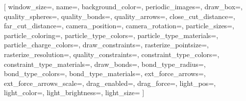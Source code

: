 \begin{pysyntax}
  [
    window_size=,                        
    name=,	 
    background_color=,
    periodic_images=,
    draw_box=,
    quality_spheres=,
    quality_bonds=,          
    quality_arrows=,            
    close_cut_distance=,
    far_cut_distance=,       
    camera_position=,
    camera_rotation=,
    particle_sizes=,
    particle_coloring=,
    particle_type_colors=,
    particle_type_materials=,
    particle_charge_colors=,	 
    draw_constraints=,			 
    rasterize_pointsize=,	     
    rasterize_resolution=,	     
    quality_constraints=,          
    constraint_type_colors=,
    constraint_type_materials=,
    draw_bonds=,				 
    bond_type_radius=,		     
    bond_type_colors=,			 
    bond_type_materials=,	     
    ext_force_arrows=, 		 
    ext_force_arrows_scale=, 	 
    drag_enabled=,		   		 
    drag_force=,		   		 
    light_pos=,				 
    light_color=,				 
    light_brightness=,   		 
    light_size=		   		 
  ]
\end{pysyntax}

